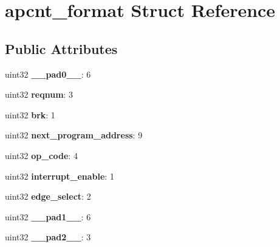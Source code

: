 \hypertarget{structapcnt__format}{}\section{apcnt\+\_\+format Struct Reference}
\label{structapcnt__format}
\subsection*{Public Attributes}
\begin{DoxyCompactItemize}
\item 
\mbox{\label{structapcnt__format_a0a06d08aeeac3a63bd4fc1cded91a5ef}} 
uint32 {\bfseries \+\_\+\+\_\+pad0\+\_\+\+\_\+}\+: 6
\item 
\mbox{\label{structapcnt__format_a2bdef73b9149fe63351d71fe2f0e5557}} 
uint32 {\bfseries reqnum}\+: 3
\item 
\mbox{\label{structapcnt__format_ab5d777667b0edb83aa441a9eef93a02d}} 
uint32 {\bfseries brk}\+: 1
\item 
\mbox{\label{structapcnt__format_ac434971f05bbd43c1fc069da0950fd08}} 
uint32 {\bfseries next\+\_\+program\+\_\+address}\+: 9
\item 
\mbox{\label{structapcnt__format_a2402a9b03543f3cb375b6fe860993baa}} 
uint32 {\bfseries op\+\_\+code}\+: 4
\item 
\mbox{\label{structapcnt__format_a93df88d190d57d887161d96b057fc5d5}} 
uint32 {\bfseries interrupt\+\_\+enable}\+: 1
\item 
\mbox{\label{structapcnt__format_a96610c1ba6b2394a63d1d26840b1e0df}} 
uint32 {\bfseries edge\+\_\+select}\+: 2
\item 
\mbox{\label{structapcnt__format_a0eeeb6ce597f48336797522bfbaf5207}} 
uint32 {\bfseries \+\_\+\+\_\+pad1\+\_\+\+\_\+}\+: 6
\item 
\mbox{\label{structapcnt__format_af3b427b7adc15fe75e0aaa4f99da6b91}} 
uint32 {\bfseries \+\_\+\+\_\+pad2\+\_\+\+\_\+}\+: 3

\end{DoxyCompactItemize}
